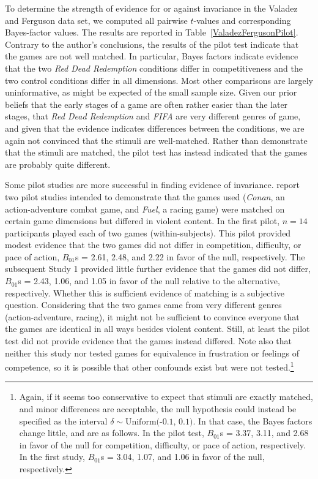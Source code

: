 \documentclass[man]{apa6}
\begin{document}
To determine the strength of evidence for or against invariance in the Valadez and Ferguson data set, we computed all pairwise $t$-values and corresponding Bayes-factor values.  The results are reported in Table~\ref{ValadezFergusonPilot}. Contrary to the author's conclusions, the results of the pilot test indicate that the games are not well matched. In particular, Bayes factors indicate evidence that the two {\em Red Dead Redemption} conditions differ in competitiveness and the two control conditions differ in all dimensions. Most other comparisons are largely uninformative, as might be expected of the small sample size. Given our prior beliefs that the early stages of a game are often rather easier than the later stages, that {\em Red Dead Redemption} and {\em FIFA} are very different genres of game, and given that the evidence indicates differences between the conditions, we are again not convinced that the stimuli are well-matched. Rather than demonstrate that the stimuli are matched, the pilot test has instead indicated that the games are probably quite different.

Some pilot studies are more successful in finding evidence of invariance. \citet{Adachi:Willoughby:2011} report two pilot studies intended to demonstrate that the games used ({\em Conan}, an action-adventure combat game, and {\em Fuel}, a racing game) were matched on certain game dimensions but differed in violent content. In the first pilot, $n = 14$ participants played each of two games (within-subjects). This pilot provided modest evidence that the two games did not differ in competition, difficulty, or pace of action, $B_{01}$s = 2.61, 2.48, and 2.22 in favor of the null, respectively. The subsequent Study 1 provided little further evidence that the games did not differ, $B_{01}$s = 2.43, 1.06, and 1.05 in favor of the null relative to the alternative, respectively. Whether this is sufficient evidence of matching is a subjective question. Considering that the two games came from very different genres (action-adventure, racing), it might not be sufficient to convince everyone that the games are identical in all ways besides violent content. Still, at least the pilot test did not provide evidence that the games instead differed. Note also that neither this study nor \citet{Valadez:Ferguson:2012} tested games for equivalence in frustration or feelings of competence, so it is possible that other confounds exist but were not tested.\footnote{Again, if it seems too conservative to expect that stimuli are exactly matched, and minor differences are acceptable, the null hypothesis could instead be specified as the interval $\delta \sim \mbox{Uniform(-0.1, 0.1)}$. In that case, the Bayes factors change little, and are as follows. In the pilot test, $B_{01}$s = 3.37, 3.11, and 2.68 in favor of the null for competition, difficulty, or pace of action, respectively. In the first study, $B_{01}$s = 3.04, 1.07, and 1.06 in favor of the null, respectively.}
\end{document}
